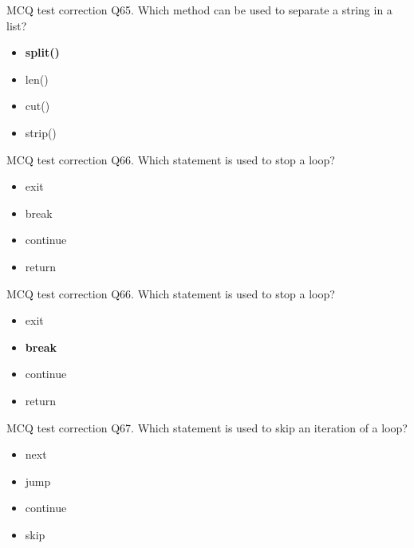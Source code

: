\documentclass[
  8pt,
  ignorenonframetext,
]{beamer}
\providecommand{\tightlist}{%
  \setlength{\itemsep}{0pt}\setlength{\parskip}{0pt}}
\begin{document}
\begin{frame}{MCQ test correction}
\protect\hypertarget{mcq-test-correction-129}{}
Q65. Which method can be used to separate a string in a list?

\begin{itemize}
\tightlist
\item
  \textbf{split()}
\item
  len()
\item
  cut()
\item
  strip()
\end{itemize}
\end{frame}

\begin{frame}{MCQ test correction}
\protect\hypertarget{mcq-test-correction-130}{}
Q66. Which statement is used to stop a loop?

\begin{itemize}
\tightlist
\item
  exit
\item
  break
\item
  continue
\item
  return
\end{itemize}
\end{frame}

\begin{frame}{MCQ test correction}
\protect\hypertarget{mcq-test-correction-131}{}
Q66. Which statement is used to stop a loop?

\begin{itemize}
\tightlist
\item
  exit
\item
  \textbf{break}
\item
  continue
\item
  return
\end{itemize}
\end{frame}

\begin{frame}{MCQ test correction}
\protect\hypertarget{mcq-test-correction-132}{}
Q67. Which statement is used to skip an iteration of a loop?

\begin{itemize}
\tightlist
\item
  next
\item
  jump
\item
  continue
\item
  skip
\end{itemize}
\end{frame}
\end{document}
